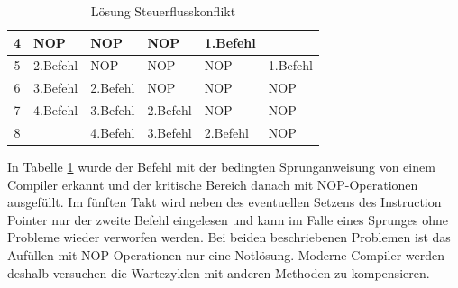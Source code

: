 \documentclass[a4paper,12pt]{article}
\begin{document}
\begin{table}[!htb]
\begin{tabular}{|c|l|l|l|l|l|}
4                       & \cellcolor[HTML]{F8A102}NOP                                                             & \cellcolor[HTML]{F8A102}NOP                                                                & \cellcolor[HTML]{F8A102}NOP                                                                 & \cellcolor[HTML]{9698ED}1.Befehl        &                                                                                               \\ \hline
5                       & \cellcolor[HTML]{38FFF8}2.Befehl                                                        & \cellcolor[HTML]{F8A102}NOP                                                                & \cellcolor[HTML]{F8A102}NOP                                                                 & \cellcolor[HTML]{F8A102}NOP             & \cellcolor[HTML]{9698ED}1.Befehl                                                              \\ \hline
6                       & \cellcolor[HTML]{67FD9A}3.Befehl                                                        & \cellcolor[HTML]{38FFF8}2.Befehl                                                           & \cellcolor[HTML]{F8A102}NOP                                                                 & \cellcolor[HTML]{F8A102}NOP             & \cellcolor[HTML]{F8A102}NOP                                                                   \\ \hline
7                       & \cellcolor[HTML]{FFFE65}4.Befehl                                                        & \cellcolor[HTML]{67FD9A}3.Befehl                                                           & \cellcolor[HTML]{38FFF8}2.Befehl                                                            & \cellcolor[HTML]{F8A102}NOP             & \cellcolor[HTML]{F8A102}NOP                                                                   \\ \hline
\multicolumn{1}{|c|}{8} &                                                                                         & \cellcolor[HTML]{FFFE65}4.Befehl                                                           & \cellcolor[HTML]{67FD9A}3.Befehl                                                            & \cellcolor[HTML]{38FFF8}2.Befehl        & \cellcolor[HTML]{F8A102}NOP                                                                   \\ \hline
\end{tabular}
\caption{Lösung Steuerflusskonflikt}
\label{tab:loesungSteuerflusskonflikt}
\end{table}
\noindent In Tabelle
 \ref{tab:loesungSteuerflusskonflikt} wurde der Befehl mit der bedingten Sprunganweisung von einem Compiler erkannt und der kritische Bereich danach mit NOP-Operationen ausgefüllt. Im fünften Takt wird neben des eventuellen Setzens des Instruction Pointer nur der zweite Befehl eingelesen und kann im Falle eines Sprunges ohne Probleme wieder verworfen werden. Bei beiden beschriebenen Problemen ist das Aufüllen mit NOP-Operationen nur eine Notlösung. Moderne Compiler werden deshalb versuchen die Wartezyklen mit anderen Methoden zu kompensieren.
\end{document}
